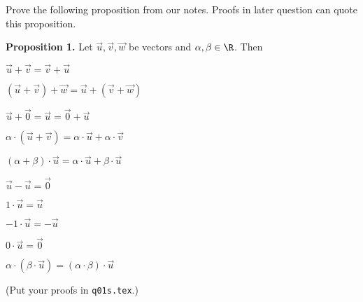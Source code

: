Prove the following proposition from our notes.
Proofs in later question can quote this proposition.

\textbf{Proposition 1.}
Let $\vec{u}, \vec{v}, \vec{w}$ be vectors and $\alpha, \beta \in \R$.
Then
\begin{myenumt}
\item $\vec{u} + \vec{v} = \vec{v} + \vec{u}$
\item $(\vec{u} + \vec{v}) + \vec{w} = \vec{u} + (\vec{v} + \vec{w})$
\item $\vec{u} + \vec{0} = \vec{u} = \vec{0} + \vec{u}$
\item $\alpha \cdot (\vec{u} + \vec{v}) = \alpha \cdot \vec{u} + \alpha \cdot \vec{v}$
\item $(\alpha + \beta) \cdot \vec{u} = \alpha \cdot \vec{u} + \beta \cdot \vec{u}$
\item $\vec{u} - \vec{u} = \vec{0}$ 
\item $1 \cdot \vec{u} = \vec{u}$
\item $-1 \cdot \vec{u} = -\vec{u}$
\item $0 \cdot \vec{u} = \vec{0}$
\item $\alpha \cdot (\beta \cdot \vec{u}) = (\alpha \cdot \beta) \cdot \vec{u}$  
\end{myenumt}
(Put your proofs in \verb!q01s.tex!.)
